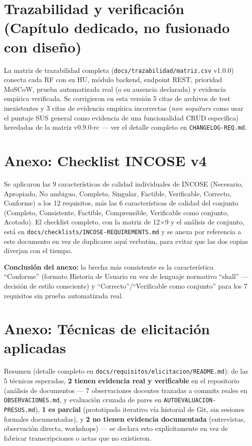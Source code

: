 \documentclass[11pt,a4paper]{article}
\begin{document}
\section{Trazabilidad y verificación (Capítulo dedicado, no fusionado con diseño)}

La matriz de trazabilidad completa (\texttt{docs/trazabilidad/matriz.csv} v1.0.0) conecta cada RF con su
HU, módulo backend, endpoint REST, prioridad MoSCoW, prueba automatizada real (o su ausencia declarada) y
evidencia empírica verificada. Se corrigieron en esta versión 5 citas de archivos de test inexistentes y
3 citas de evidencia empírica incorrectas (\textit{non sequiturs} como usar el puntaje SUS general como
evidencia de una funcionalidad CRUD específica) heredadas de la matriz v0.9.0-rc --- ver el detalle
completo en \texttt{CHANGELOG-REQ.md}.

\section{Anexo: Checklist INCOSE v4}

Se aplicaron las 9 características de calidad individuales de INCOSE (Necesario, Apropiado, No ambiguo,
Completo, Singular, Factible, Verificable, Correcto, Conforme) a los 12 requisitos, más las 6
características de calidad del conjunto (Completo, Consistente, Factible, Comprensible, Verificable como
conjunto, Acotado). El checklist completo, con la matriz de 12$\times$9 y el análisis de conjunto, está
en \texttt{docs/checklists/INCOSE-REQUIREMENTS.md} y se anexa por referencia a este documento en vez de
duplicarse aquí verbatim, para evitar que las dos copias diverjan con el tiempo.

\textbf{Conclusión del anexo:} la brecha más consistente es la característica ``Conforme'' (formato
Historia de Usuario en vez de lenguaje normativo ``shall'' --- decisión de estilo consciente) y
``Correcto''/``Verificable como conjunto'' para los 7 requisitos sin prueba automatizada real.

\section{Anexo: Técnicas de elicitación aplicadas}

Resumen (detalle completo en \texttt{docs/requisitos/elicitacion/README.md}): de las 5 técnicas
esperadas, \textbf{2 tienen evidencia real y verificable} en el repositorio (análisis de documentos ---
7 observaciones docentes trazadas a commits reales en \texttt{OBSERVACIONES.md}, y evaluación cruzada de
pares en \texttt{AUTOEVALUACION-PRESUS.md}), \textbf{1 es parcial} (prototipado iterativo vía historial
de Git, sin sesiones formales documentadas), y \textbf{2 no tienen evidencia documentada} (entrevistas,
observación directa, workshops) --- se declara esto explícitamente en vez de fabricar transcripciones o
actas que no existieron.
\end{document}
